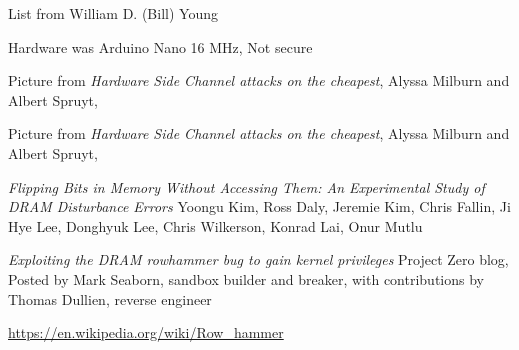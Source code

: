 \documentclass[Screen16to9,17pt]{foils}
\begin{document}
List from William D. (Bill) Young



Hardware was Arduino Nano 16 MHz, Not secure

Picture from
\emph{Hardware Side Channel attacks on the cheapest}, Alyssa Milburn and Albert Spruyt,



Picture from
\emph{Hardware Side Channel attacks on the cheapest}, Alyssa Milburn and Albert Spruyt,



\emph{Flipping Bits in Memory Without Accessing Them: An Experimental Study of DRAM Disturbance Errors} Yoongu Kim, Ross Daly, Jeremie Kim, Chris Fallin, Ji Hye Lee, Donghyuk Lee, Chris Wilkerson, Konrad Lai, Onur Mutlu\\
{\footnotesize{}}

\emph{Exploiting the DRAM rowhammer bug to gain kernel privileges}
Project Zero blog, Posted by Mark Seaborn, sandbox builder and breaker, with contributions by Thomas Dullien, reverse engineer\\
{\footnotesize{}}

\url{https://en.wikipedia.org/wiki/Row_hammer}



\slidenext
\end{document}
